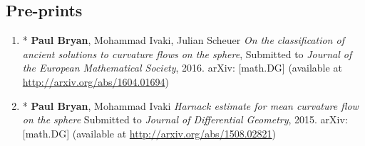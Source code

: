 \documentclass[12pt]{amsart}
\begin{document}
\subsection*{Pre-prints}
\label{sec-2-1}

\begin{enumerate}[resume]
\item * \textbf{Paul Bryan}, Mohammad Ivaki, Julian Scheuer \emph{On the classification of ancient solutions to curvature flows on the sphere}, Submitted to \emph{Journal of the European Mathematical Society}, 2016. arXiv: [math.DG] (available at \url{http://arxiv.org/abs/1604.01694})
\item * \textbf{Paul Bryan}, Mohammad Ivaki \emph{Harnack estimate for mean curvature flow on the sphere} Submitted to \emph{Journal of Differential Geometry}, 2015. arXiv: [math.DG] (available at \url{http://arxiv.org/abs/1508.02821})
\end{enumerate}
\end{document}
